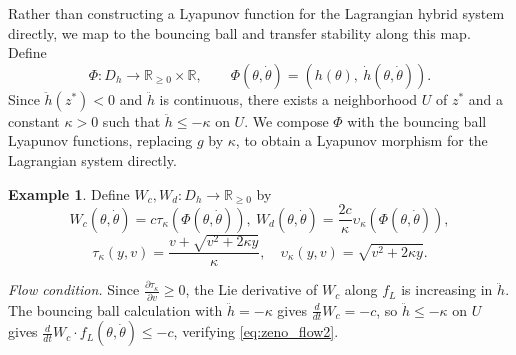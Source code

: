 \documentclass[letterpaper, 10 pt, conference]{IEEEconf}
\theoremstyle{definition}
\newtheorem{example}[thm]{Example}
\newcommand{\maps}{\colon}
\newcommand{\R}{\mathbb R}
\begin{document}
Rather than constructing a Lyapunov function for the Lagrangian hybrid system directly, we map to the bouncing ball and transfer stability along this map. Define
\begin{equation*}
    \Phi \maps D_h \to \R_{\geq 0} \times \R, \qquad \Phi(\theta, \dot\theta) = (h(\theta),\ \dot{h}(\theta, \dot\theta)).
\end{equation*}
Since $\ddot{h}(z^*) < 0$ and $\ddot{h}$ is continuous, there exists a neighborhood $U$ of $z^*$ and a constant $\kappa > 0$ such that $\ddot{h} \leq -\kappa$ on $U$. We compose $\Phi$ with the bouncing ball Lyapunov functions, replacing $g$ by $\kappa$, to obtain a Lyapunov morphism for the Lagrangian system directly.

\begin{example}%
\label{ex:LagrangianHybrid}
    Define $W_c, W_d \maps D_h \to \R_{\geq 0}$ by
    \begin{equation*}
        W_c(\theta, \dot\theta) = c  \tau_\kappa(\Phi(\theta, \dot\theta)), \ 
        W_d(\theta, \dot\theta) = \frac{2c}{\kappa} \upsilon_\kappa(\Phi(\theta, \dot\theta)),
    \end{equation*}
    \begin{equation*}
        \tau_\kappa(y, v) = \frac{v + \sqrt{v^2 + 2\kappa y}}{\kappa}, \quad \upsilon_\kappa(y, v) = \sqrt{v^2 + 2\kappa y}.
    \end{equation*}

    \textit{Flow condition.} Since $\frac{\partial \tau_\kappa}{\partial v} \geq 0$, the Lie derivative of $W_c$ along $f_L$ is increasing in $\ddot{h}$. The bouncing ball calculation with $\ddot{h} = -\kappa$ gives $\frac{d}{dt}W_c = -c$, so $\ddot{h} \leq -\kappa$ on $U$ gives $\frac{d}{dt}W_c \cdot f_L(\theta, \dot\theta) \leq -c$, verifying \eqref{eq:zeno_flow2}.


\end{example}
\end{document}
